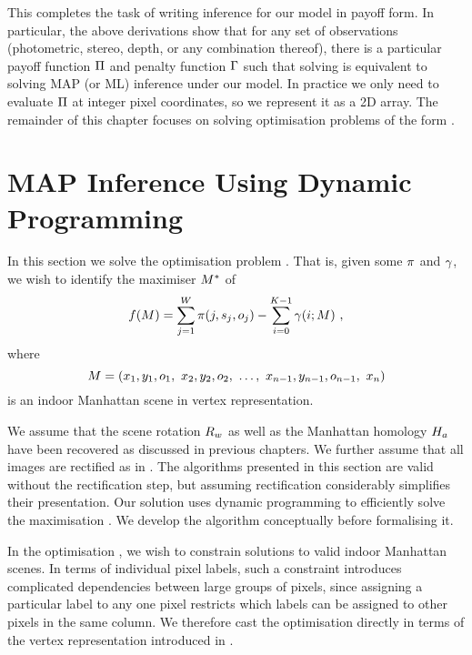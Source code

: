 This completes the task of writing inference for our model in payoff
form. In particular, the above derivations show that for any set of
observations (photometric, stereo, depth, or any combination thereof),
there is a particular payoff function $\ScenePayoff$ and penalty
function $\ScenePenalty$ such that solving  is
equivalent to solving MAP (or ML) inference under our model. In
practice we only need to evaluate $\ScenePayoff$ at integer pixel
coordinates, so we represent it as a 2D array. The remainder of this
chapter focuses on solving optimisation problems of the form
.


\section{MAP Inference Using Dynamic Programming}

In this section we solve the optimisation problem
. That is, given some $\PixelPayoff$ and
$\CornerPenalty$, we wish to identify the maximiser $\OptimalScene$ of
\begin{equation}
  \Objective(\Scene) =
    \sum_{j=1}^{\Width} \PixelPayoff(j,\seam_j,\WallOrient_j) -
    \sum_{i=0}^{\NumWalls-1} \CornerPenalty(i;\Scene) ~,
\end{equation}
where
\begin{equation}
  \Scene =
  ( x_1,y_1,\WallOrient_1,
   ~x_2,y_2,\WallOrient_2,
   ~\ldots,
   ~x_{n-1},y_{n-1},\WallOrient_{n-1}, ~x_n )
\end{equation}
is an indoor Manhattan scene in vertex representation.

We assume that the scene rotation $\SceneR$ as well as the Manhattan
homology $\Hcf$ have been recovered as discussed in
previous chapters. We further assume that all images are rectified
as in . The algorithms presented in this section
are valid without the rectification step, but assuming rectification
considerably simplifies their presentation. Our solution uses dynamic
programming to efficiently solve the maximisation
. We develop the algorithm conceptually before
formalising it.

In the optimisation , we wish to constrain solutions
to valid indoor Manhattan scenes. In terms of individual pixel labels,
such a constraint introduces complicated dependencies between large
groups of pixels, since assigning a particular label to any one pixel
restricts which labels can be assigned to other pixels in the same
column. We therefore cast the optimisation directly in terms of the
vertex representation introduced in .

